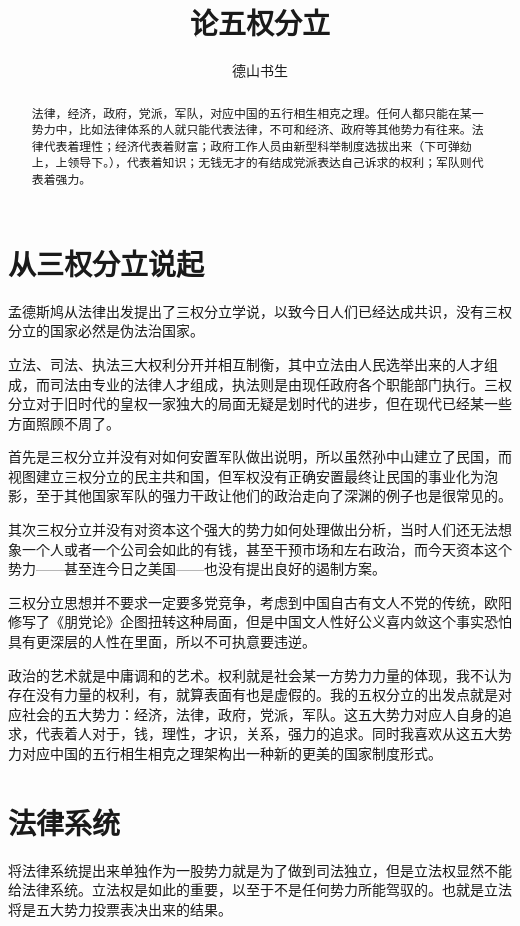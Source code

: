 \documentclass[11pt,oneside]{article}
\begin{document}
\title{论五权分立}
\author{德山书生}
\date{}
\maketitle

\begin{abstract}
法律，经济，政府，党派，军队，对应中国的五行相生相克之理。任何人都只能在某一势力中，比如法律体系的人就只能代表法律，不可和经济、政府等其他势力有往来。法律代表着理性；经济代表着财富；政府工作人员由新型科举制度选拔出来（下可弹劾上，上领导下。），代表着知识；无钱无才的有结成党派表达自己诉求的权利；军队则代表着强力。
\end{abstract}


\begin{common-format}
\section{从三权分立说起}
孟德斯鸠从法律出发提出了三权分立学说，以致今日人们已经达成共识，没有三权分立的国家必然是伪法治国家。

立法、司法、执法三大权利分开并相互制衡，其中立法由人民选举出来的人才组成，而司法由专业的法律人才组成，执法则是由现任政府各个职能部门执行。三权分立对于旧时代的皇权一家独大的局面无疑是划时代的进步，但在现代已经某一些方面照顾不周了。

首先是三权分立并没有对如何安置军队做出说明，所以虽然孙中山建立了民国，而视图建立三权分立的民主共和国，但军权没有正确安置最终让民国的事业化为泡影，至于其他国家军队的强力干政让他们的政治走向了深渊的例子也是很常见的。

其次三权分立并没有对资本这个强大的势力如何处理做出分析，当时人们还无法想象一个人或者一个公司会如此的有钱，甚至干预市场和左右政治，而今天资本这个势力——甚至连今日之美国——也没有提出良好的遏制方案。

三权分立思想并不要求一定要多党竞争，考虑到中国自古有文人不党的传统，欧阳修写了《朋党论》企图扭转这种局面，但是中国文人性好公义喜内敛这个事实恐怕具有更深层的人性在里面，所以不可执意要违逆。

政治的艺术就是中庸调和的艺术。权利就是社会某一方势力力量的体现，我不认为存在没有力量的权利，有，就算表面有也是虚假的。我的五权分立的出发点就是对应社会的五大势力：经济，法律，政府，党派，军队。这五大势力对应人自身的追求，代表着人对于，钱，理性，才识，关系，强力的追求。同时我喜欢从这五大势力对应中国的五行相生相克之理架构出一种新的更美的国家制度形式。


\section{法律系统}
将法律系统提出来单独作为一股势力就是为了做到司法独立，但是立法权显然不能给法律系统。立法权是如此的重要，以至于不是任何势力所能驾驭的。也就是立法将是五大势力投票表决出来的结果。


\end{common-format}
\end{document}
